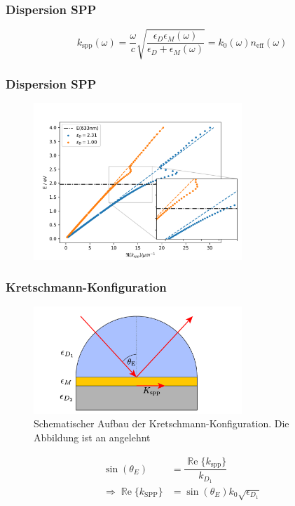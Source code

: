 \documentclass[aspectratio=1610]{beamer}
\renewcommand{\Re}{\operatorname{\mathbb{R}e}}
\begin{document}
		\begin{frame}
			\frametitle{Dispersion SPP}
			\begin{equation}
				\boxed{k_{\mathrm{spp}}\left(\omega\right) = \dfrac{\omega}{c} \sqrt{\dfrac{\epsilon_D\epsilon_M(\omega)}{\epsilon_D + 	\epsilon_M(\omega)}}  = k_0(\omega) n_{\mathrm{eff}}(\omega)}
			\end{equation}	
		\end{frame}	
		
		\begin{frame}
		\frametitle{Dispersion SPP}
		\begin{figure}[h]
			\centering
			\includegraphics[width=0.7\textwidth]{figures/dispersion.png}
		\end{figure}
		\end{frame}
	
		\begin{frame}
		\frametitle{Kretschmann-Konfiguration}
		\begin{figure}[h] 
			\centering
			\includegraphics[width=0.7\textwidth]{figures/Kretschmann.pdf}
			\caption[Kretschmann-Konfiguration]{Schematischer Aufbau der Kretschmann-Konfiguration. Die Abbildung ist an \cite{Jaruschewski.2020} angelehnt}
		\end{figure}
		\begin{align}
			\sin(\theta_E) &= \dfrac{\Re\{k_{\mathrm{spp}}\}}{k_{D_1}}\\
			\Rightarrow \Re\{k_{\mathrm{SPP}}\} &= \sin(\theta_E) k_0 \sqrt{\epsilon_{D_1}}
		\end{align}
		\end{frame}
	
\end{document}
